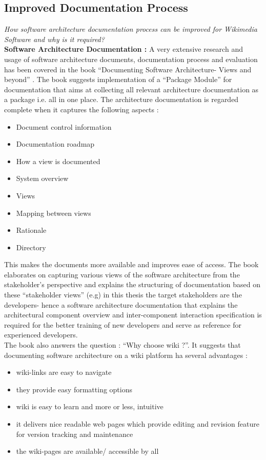 \subsection{Improved Documentation Process}
\indent \emph{How software architecture documentation process can be improved for
Wikimedia Software and why is it required?}
\newline
\\\indent \textbf{Software Architecture Documentation : } A very extensive research and usage of software architecture documents, documentation process and evaluation has been covered in the book \enquote{Documenting Software Architecture- Views and beyond} \cite{BachmannDocumentingSoftware2010}. The book suggests implementation of a \enquote{Package Module} for documentation that aims at collecting all relevant architecture documentation as a package i.e. all in one place. The architecture documentation is regarded complete when it captures the following aspects :
\begin{itemize}
\item Document control information 
\item Documentation roadmap 
\item How a view is documented
\item System overview 
\item Views 
\item Mapping between views 
\item Rationale
\item Directory
\end{itemize}
This makes the documents more available and improves ease of access. The book elaborates on capturing various views of the software architecture from the stakeholder's perspective and explains the structuring of documentation based on these \enquote{stakeholder views} (e.g) in this thesis the target stakeholders are the developers- hence a software architecture documentation that explains the architectural component overview and inter-component interaction specification is required for the better training of new developers and serve as reference for experienced developers.
\\\indent The book also answers the question : \enquote{Why choose wiki ?}. It suggests that documenting software architecture on a wiki platform ha several advantages :
\begin{itemize}
\item wiki-links are easy to navigate
\item they provide easy formatting options 
\item wiki is easy to learn and more or less, intuitive
\item it delivers nice readable web pages which provide editing and revision feature for version tracking and maintenance
\item the wiki-pages are available/ accessible by all
\end{itemize}
